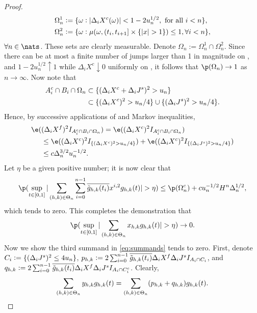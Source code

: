 \begin{proof}
\begin{align}
&\Omega_n^1 := \{ \omega: \vert\Delta_i X^c(\omega)\vert <   1-  2u_n^{1/2} , \text{ for all }i < n   \},\notag \\
&\Omega_n^2 := \{\omega : \mu(\omega,  (t_i, t_{i+1}] \times \{\vert x \vert > 1\} ) \le 1, \forall i <n  \},\notag 
\end{align}
$\forall n \in \nats$. These sets are clearly measurable. Denote $\Omega_n   := \Omega_n^1 \cap \Omega_n^2 $. Since there can be at most a finite number of jumps  larger than 1  in magnitude    on \domain,  and  $1 - 2u_n^{1/2} \uparrow 1$ while $ \Delta_iX^c \downarrow  0 $  uniformly  on \domain, it follows that $ \p(\Omega_n) \to 1$ as $n \to \infty$. Now note that 
\begin{align}
  \notag
  A_i^c \cap B_i \cap \Omega_n & \subset  \{ (\Delta_i X^c + \Delta_i J^s)^2 > u_n \} \notag\\
  &\subset \{(\Delta_i X^c)^2 > u_n/4\} \cup \{(\Delta_i J^s)^2 > u_n/4\}\notag .
  \label{}
\end{align}
Hence, by successive applications of \holder and Markov inequalities,   
\begin{align}
  \notag
 \e(&(\dxf)^2 I_{A_i^c \cap B_i \cap \Omega_n} ) = \e((\dxc)^2 I_{A_i^c \cap B_i \cap \Omega_n} )\notag \\
 &\le \e((\dxc)^2 I_{\{(\dxc)^2 > u_n/4\}}) + \e((\dxc)^2 I_{\{(\djt)^2 > u_n/4\}}) \label{} \notag\\
 & \le c \Delta_n^{3/2} u_n^{-1/2}.\notag
\end{align}
Let $\eta$ be a given positive number; it is now clear that
\begin{align}
  \p(\sup_{t \in \domain} \vert \sumt\sumin  \btghki x^{i,2} \ghk(t)\vert  > \eta) \le  \p(\Omega_n^c)  + c u^{-1/2}_nH^n\Delta_n^{1/2}, \notag
  \label{}
\end{align}
which tends to zero.  This completes the demonstration that \begin{align}\label{eq:x} \p(\sup_{t \in [0,1]}\vert \sumt x_{h,k} \ghk(t) \vert > \eta) \to 0. \end{align}
Now we show the third summand in  \eqref{eq:summands} tends to zero. First, denote $C_i := \{( \Delta_i J^s )^2 \le 4 u_n\}$, $p_{h,k} : = 2 \sum_{i = 0}^{n-1} \overline{\tilde{g}_{h,k}(t_i)}\Delta_i X^f \Delta_i J^s I_{A_i \cap C_i}$, and $q_{h,k} := 2 \sum_{i = 0}^{n-1} \overline{\tilde{g}_{h,k}(t_i)}\Delta_i X^f \Delta_i J^s I_{A_i \cap C_i^c}$. Clearly, 
\begin{align} 
  \sum_{(h,k) \in \Theta_n} y_{h,k} g_{h,k}(t)  = \sum_{(h,k) \in \Theta_n} (p_{h,k} + q_{h,k}) g_{h,k}(t).\notag
\end{align}

\end{proof}
